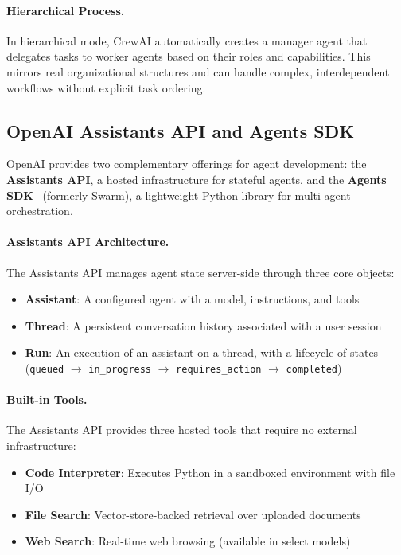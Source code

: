 \paragraph{Hierarchical Process.}
\label{hierarchical-process.}

In hierarchical mode, CrewAI automatically creates a manager agent that delegates tasks to worker agents based on their roles and capabilities. This mirrors real organizational structures and can handle complex, interdependent workflows without explicit task ordering.

\subsection{OpenAI Assistants API and Agents SDK}
\label{subsubsec:openai-agents}

OpenAI provides two complementary offerings for agent development: the \textbf{Assistants API}, a hosted infrastructure for stateful agents, and the \textbf{Agents SDK}~\cite{openai2024agentssdk} (formerly Swarm), a lightweight Python library for multi-agent orchestration.

\paragraph{Assistants API Architecture.}
\label{assistants-api-architecture.}

The Assistants API manages agent state server-side through three core objects:

\begin{itemize}
  \item \textbf{Assistant}: A configured agent with a model, instructions, and tools
  \item \textbf{Thread}: A persistent conversation history associated with a user session
  \item \textbf{Run}: An execution of an assistant on a thread, with a lifecycle of states (\texttt{queued} $\to$ \texttt{in\_progress} $\to$ \texttt{requires\_action} $\to$ \texttt{completed})
\end{itemize}

\paragraph{Built-in Tools.}
\label{built-in-tools.}

The Assistants API provides three hosted tools that require no external infrastructure:

\begin{itemize}
  \item \textbf{Code Interpreter}: Executes Python in a sandboxed environment with file I/O
  \item \textbf{File Search}: Vector-store-backed retrieval over uploaded documents
  \item \textbf{Web Search}: Real-time web browsing (available in select models)
\end{itemize}

